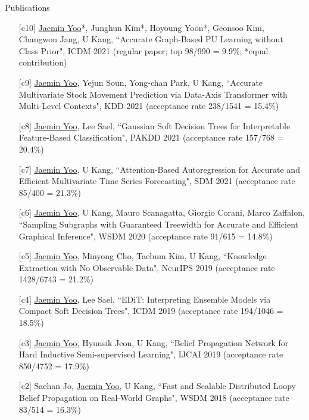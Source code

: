 \documentclass{resume} %
\begin{document}
\begin{rSection}{Publications}
\smallskip
\begin{enumerate}

	\item[{[c10]}] \underline{Jaemin Yoo}*, Junghun Kim*, Hoyoung Yoon*, Geonsoo Kim, Changwon Jang, U Kang, ``Accurate Graph-Based PU Learning without Class Prior", ICDM 2021 (regular paper; top 98/990 = 9.9\%; *equal contribution)

	\item[{[c9]}] \underline{Jaemin Yoo}, Yejun Soun, Yong-chan Park, U Kang, ``Accurate Multivariate Stock Movement Prediction via Data-Axis Transformer with Multi-Level Contexts", KDD 2021 (acceptance rate 238/1541 = 15.4\%)

	\item[{[c8]}] \underline{Jaemin Yoo}, Lee Sael, ``Gaussian Soft Decision Trees for Interpretable Feature-Based Classification", PAKDD 2021 (acceptance rate 157/768 = 20.4\%)
		
	\item[{[c7]}] \underline{Jaemin Yoo}, U Kang, ``Attention-Based Autoregression for Accurate and Efficient Multivariate Time Series Forecasting", SDM 2021 (acceptance rate 85/400 = 21.3\%)

	\item[{[c6]}] \underline{Jaemin Yoo}, U Kang, Mauro Scanagatta, Giorgio Corani, Marco Zaffalon, ``Sampling Subgraphs with Guaranteed Treewidth for Accurate and Efficient Graphical Inference", WSDM 2020 (acceptance rate 91/615 = 14.8\%)

	\item[{[c5]}] \underline{Jaemin Yoo}, Minyong Cho, Taebum Kim, U Kang, ``Knowledge Extraction with No Observable Data", NeurIPS 2019 (acceptance rate 1428/6743 = 21.2\%)

	\item[{[c4]}] \underline{Jaemin Yoo}, Lee Sael, ``EDiT: Interpreting Ensemble Models via Compact Soft Decision Trees", ICDM 2019 (acceptance rate 194/1046 = 18.5\%)

	\item[{[c3]}] \underline{Jaemin Yoo}, Hyunsik Jeon, U Kang, ``Belief Propagation Network for Hard Inductive Semi-supervised Learning", IJCAI 2019 (acceptance rate 850/4752 = 17.9\%)

	\item[{[c2]}] Saehan Jo, \underline{Jaemin Yoo}, U Kang, ``Fast and Scalable Distributed Loopy Belief Propagation on Real-World Graphs", WSDM 2018 (acceptance rate 83/514 = 16.3\%)


\end{enumerate}
\end{rSection}
\end{document}
